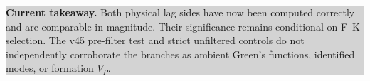 \documentclass[11pt]{article}
\newcommand{\takeaway}[1]{\par\smallskip\noindent\colorbox{lightgray}{\parbox{0.95\linewidth}{\textbf{Current takeaway.} #1}}\par\medskip}
\begin{document}
\takeaway{Both physical lag sides have now been computed correctly and are
comparable in magnitude. Their significance remains conditional on F--K selection. The v45
pre-filter test and strict unfiltered controls do not independently corroborate
the branches as ambient Green's functions, identified modes, or formation
\(V_P\).}
\end{document}
